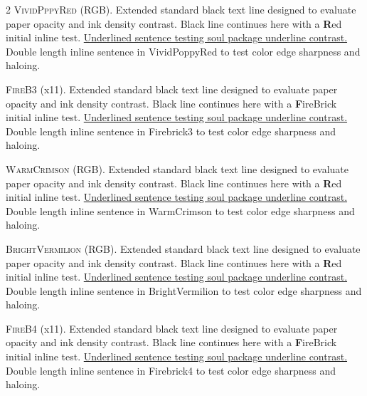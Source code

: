 \begin{multicols}{2}
\lettrine[lines=2]{\textcolor{VividPoppyRed}{V}}{ividPppyRed} (RGB). Extended standard black text line designed to evaluate paper opacity and ink density contrast. Black line continues here with a \textbf{\textcolor{VividPoppyRed}{R}}ed initial inline test. \ul{Underlined sentence testing soul package underline contrast.} \textcolor{VividPoppyRed}{Double length inline sentence in VividPoppyRed to test color edge sharpness and haloing.}


\lettrine[lines=2]{\textcolor{Firebrick3}{F}}{ireB3} (x11). Extended standard black text line designed to evaluate paper opacity and ink density contrast. Black line continues here with a \textbf{\textcolor{Firebrick3}{F}}ireBrick initial inline test. \ul{Underlined sentence testing soul package underline contrast.} \textcolor{Firebrick3}{Double length inline sentence in Firebrick3 to test color edge sharpness and haloing.}


\lettrine[lines=2]{\textcolor{WarmCrimson}{W}}{armCrimson} (RGB). Extended standard black text line designed to evaluate paper opacity and ink density contrast. Black line continues here with a \textbf{\textcolor{WarmCrimson}{R}}ed initial inline test. \ul{Underlined sentence testing soul package underline contrast.} \textcolor{WarmCrimson}{Double length inline sentence in WarmCrimson to test color edge sharpness and haloing.}


\lettrine[lines=2]{\textcolor{BrightVermilion}{B}}{rightVermilion} (RGB). Extended standard black text line designed to evaluate paper opacity and ink density contrast. Black line continues here with a \textbf{\textcolor{BrightVermilion}{R}}ed initial inline test. \ul{Underlined sentence testing soul package underline contrast.} \textcolor{BrightVermilion}{Double length inline sentence in BrightVermilion to test color edge sharpness and haloing.}


\lettrine[lines=2]{\textcolor{Firebrick4}{F}}{ireB4} (x11). Extended standard black text line designed to evaluate paper opacity and ink density contrast. Black line continues here with a \textbf{\textcolor{Firebrick4}{F}}ireBrick initial inline test. \ul{Underlined sentence testing soul package underline contrast.} \textcolor{Firebrick4}{Double length inline sentence in Firebrick4 to test color edge sharpness and haloing.}




\end{multicols}
